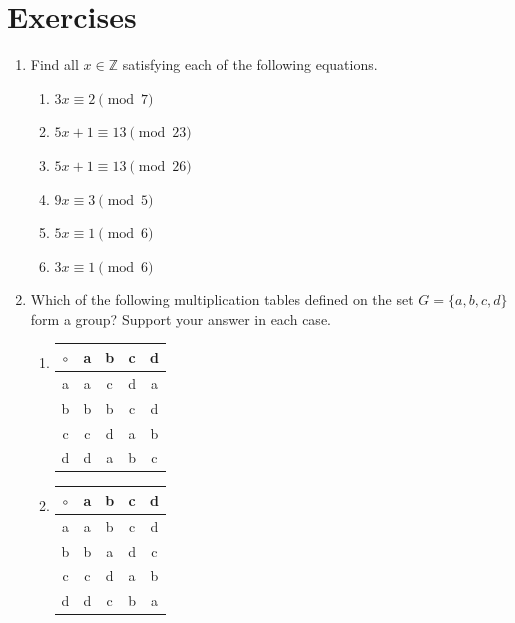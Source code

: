  
\section*{Exercises}
\exrule

{\small
\begin{enumerate}

\item
Find all $x \in {\mathbb Z}$ satisfying each of the following equations.
\begin{multicols}{2}
\begin{enumerate}

\item 
$3x \equiv 2 \pmod{ 7}$

\item
$5x + 1 \equiv 13 \pmod{ 23}$

\item
$5x + 1 \equiv 13 \pmod{ 26}$

\item
$9x \equiv 3 \pmod{ 5}$

\item
$5x \equiv 1 \pmod{ 6}$

\item
$3x \equiv 1 \pmod{ 6}$

\end{enumerate}
\end{multicols}
  

 
 \item   %
Which of the following multiplication tables defined on the set $G =
\{ a, b, c, d \}$ form a group? Support your answer in each case. 
\begin{multicols}{2}
\begin{enumerate}

\item
\begin{center}
\begin{tabular}{c|cccc}
$\circ$ & a & b & c & d \\
\hline
a & a & c & d & a \\
b & b & b & c & d \\
c & c & d & a & b \\
d & d & a & b & c
\end{tabular}
\end{center}



\item
\begin{center}
\begin{tabular}{c|cccc}
$\circ$ & a & b & c & d \\
\hline
a & a & b & c & d \\
b & b & a & d & c \\
c & c & d & a & b \\
d & d & c & b & a
\end{tabular}
\end{center}


\end{enumerate}
\end{multicols}
\end{enumerate}}
